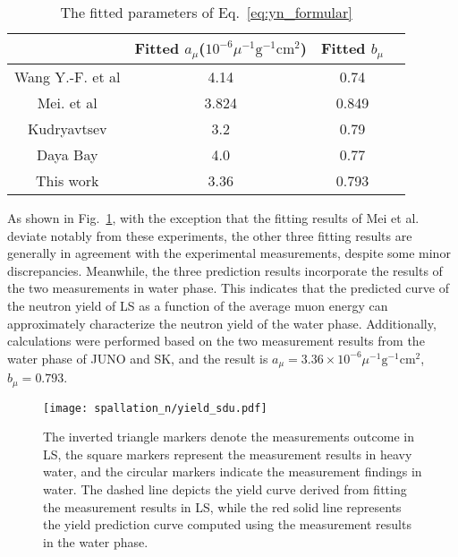 \begin{table}[htbp]
	\centering
	\caption{The fitted parameters of Eq.~\eqref{eq:yn_formular}}
	\label{tab:fit_E_mu}
	\begin{tabular}{cccc}
		\toprule
		                 & Fitted $a_{\mu}$($10^{-6}\mu^{-1}\mathrm{g}^{-1}\mathrm{cm}^{2}$) & Fitted $b_{\mu}$ \\
		\midrule
		Wang Y.-F. et al & 4.14                                                              & 0.74             \\
		Mei. et al       & 3.824                                                             & 0.849            \\
		Kudryavtsev      & 3.2                                                               & 0.79             \\
		Daya Bay         & 4.0                                                               & 0.77             \\
		This work        & 3.36                                                              & 0.793            \\
		\bottomrule
	\end{tabular}
\end{table}

As shown in Fig.~\ref{fig:yield_fit_formuler}, with the exception that the fitting results of Mei et al. deviate notably from these experiments, the other three fitting results are generally in agreement with the experimental measurements, despite some minor discrepancies. Meanwhile, the three prediction results incorporate the results of the two measurements in water phase. This indicates that the predicted curve of the neutron yield of LS as a function of the average muon energy can approximately characterize the neutron yield of the water phase. Additionally, calculations were performed based on the two measurement results from the water phase of JUNO and SK, and the result is $a_{\mu}=3.36\times10^{-6}\mu^{-1}\mathrm{g}^{-1}\mathrm{cm}^{2}$, $b_{\mu}=0.793$.

\begin{figure}[htbp]
	\centering
	\texttt{[image: spallation\_n/yield\_sdu.pdf]}
	\caption{The inverted triangle markers denote the measurements outcome in LS, the square markers represent the measurement results in heavy water, and the circular markers indicate the measurement findings in water. The dashed line depicts the yield curve derived from fitting the measurement results in LS, while the red solid line represents the yield prediction curve computed using the measurement results in the water phase. }
	\label{fig:yield_fit_formuler}
\end{figure}